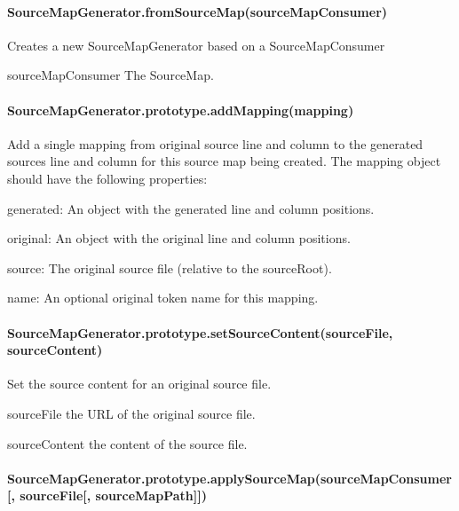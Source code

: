 \paragraph*{Source\+Map\+Generator.\+from\+Source\+Map(source\+Map\+Consumer)}

Creates a new Source\+Map\+Generator based on a Source\+Map\+Consumer


\begin{DoxyItemize}
\item {\ttfamily source\+Map\+Consumer} The Source\+Map.
\end{DoxyItemize}

\paragraph*{Source\+Map\+Generator.\+prototype.\+add\+Mapping(mapping)}

Add a single mapping from original source line and column to the generated source\textquotesingle{}s line and column for this source map being created. The mapping object should have the following properties\+:


\begin{DoxyItemize}
\item {\ttfamily generated}\+: An object with the generated line and column positions.
\item {\ttfamily original}\+: An object with the original line and column positions.
\item {\ttfamily source}\+: The original source file (relative to the source\+Root).
\item {\ttfamily name}\+: An optional original token name for this mapping.
\end{DoxyItemize}

\paragraph*{Source\+Map\+Generator.\+prototype.\+set\+Source\+Content(source\+File, source\+Content)}

Set the source content for an original source file.


\begin{DoxyItemize}
\item {\ttfamily source\+File} the U\+RL of the original source file.
\item {\ttfamily source\+Content} the content of the source file.
\end{DoxyItemize}

\paragraph*{Source\+Map\+Generator.\+prototype.\+apply\+Source\+Map(source\+Map\+Consumer\mbox{[}, source\+File\mbox{[}, source\+Map\+Path\mbox{]}\mbox{]})}

